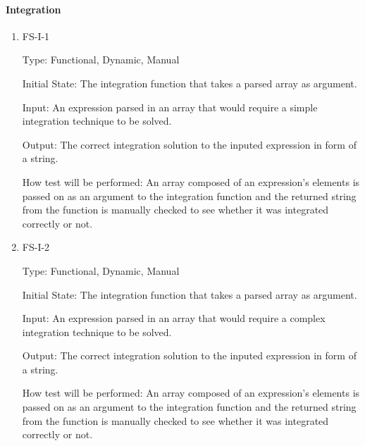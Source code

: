 \documentclass[12pt, titlepage]{article}
\begin{document}
\paragraph{Integration}
\begin{enumerate}

\item{FS-I-1}

Type: Functional, Dynamic, Manual
					
Initial State: The integration function that takes a parsed array as argument.
					
Input: An expression parsed in an array that would require a simple integration technique to be solved.
					
Output: The correct integration solution to the inputed expression in form of a string. 
					
How test will be performed: An array composed of an expression's elements is passed on as an argument to the integration function and the returned string from the function is manually checked to see whether it was integrated correctly or not.
					
\item{FS-I-2}

Type: Functional, Dynamic, Manual
					
Initial State: The integration function that takes a parsed array as argument.
					
Input: An expression parsed in an array that would require a complex integration technique to be solved.
					
Output: The correct integration solution to the inputed expression in form of a string. 
					
How test will be performed: An array composed of an expression's elements is passed on as an argument to the integration function and the returned string from the function is manually checked to see whether it was integrated correctly or not.
\end{enumerate}

		
\end{document}
